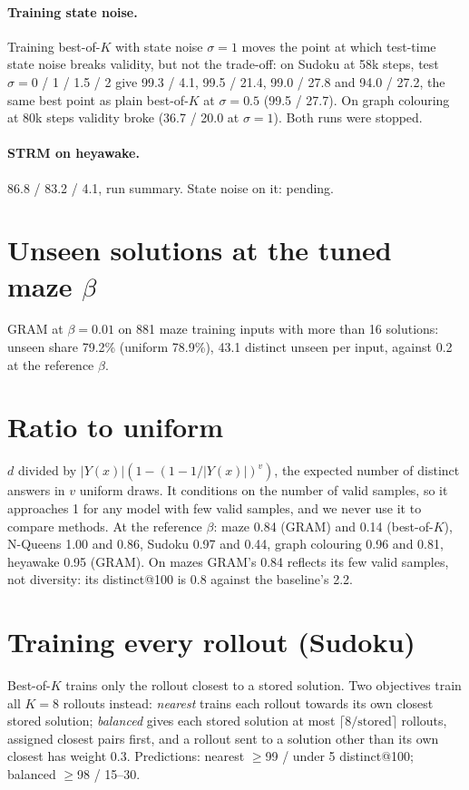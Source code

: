 \documentclass[11pt]{article}
\newcommand{\bok}{best-of-$K$}
\newcommand{\Bok}{Best-of-$K$}
\newcommand{\Y}{|Y(x)|}
\begin{document}
\paragraph{Training state noise.} Training \bok{} with state noise $\sigma=1$ moves the point at which test-time state
noise breaks validity, but not the trade-off: on Sudoku at 58k steps, test $\sigma=0$ / 1 / 1.5 / 2 give 99.3 / 4.1,
99.5 / 21.4, 99.0 / 27.8 and 94.0 / 27.2, the same best point as plain \bok{} at $\sigma=0.5$ (99.5 / 27.7). On graph
colouring at 80k steps validity broke (36.7 / 20.0 at $\sigma=1$). Both runs were stopped.

\paragraph{STRM on heyawake.} 86.8 / 83.2 / 4.1, run summary. State noise on it: pending.

\section{Unseen solutions at the tuned maze $\beta$}

GRAM at $\beta=0.01$ on 881 maze training inputs with more than 16 solutions: unseen share 79.2\% (uniform 78.9\%),
43.1 distinct unseen per input, against 0.2 at the reference $\beta$.

\section{Ratio to uniform}

$d$ divided by $\Y(1-(1-1/\Y)^v)$, the expected number of distinct answers in $v$ uniform draws. It conditions on the
number of valid samples, so it approaches 1 for any model with few valid samples, and we never use it to compare
methods. At the reference $\beta$: maze 0.84 (GRAM) and 0.14 (\bok), N-Queens 1.00 and 0.86, Sudoku 0.97 and 0.44,
graph colouring 0.96 and 0.81, heyawake 0.95 (GRAM). On mazes GRAM's 0.84 reflects its few valid samples, not
diversity: its distinct@100 is 0.8 against the baseline's 2.2.

\section{Training every rollout (Sudoku)}

\Bok{} trains only the rollout closest to a stored solution. Two objectives train all $K=8$ rollouts instead:
\emph{nearest} trains each rollout towards its own closest stored solution; \emph{balanced} gives each stored solution
at most $\lceil 8/\text{stored}\rceil$ rollouts, assigned closest pairs first, and a rollout sent to a solution other
than its own closest has weight 0.3. Predictions: nearest $\ge$99 / under 5 distinct@100; balanced $\ge$98 / 15--30.
\end{document}

